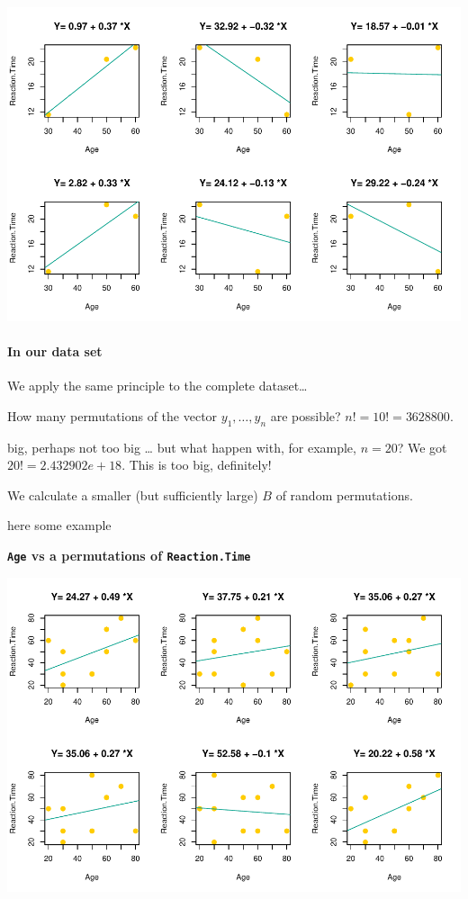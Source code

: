 \documentclass[
]{article}
\begin{document}
\begin{center}\includegraphics{perm_files/figure-latex/unnamed-chunk-9-1} \end{center}

\hypertarget{in-our-data-set}{%
\paragraph{In our data set}\label{in-our-data-set}}

We apply the same principle to the complete dataset\ldots{}

How many permutations of the vector \(y_1,\ldots,y_n\) are possible?
\(n!=10!=3628800\).

big, perhaps not too big \ldots{} but what happen with, for example,
\(n=20\)? We got \(20!=2.432902e+18\). This is too big, definitely!

We calculate a smaller (but sufficiently large) \(B\) of random
permutations.

here some example

\textbf{\texttt{Age} vs a permutations of \texttt{Reaction.Time}}

\begin{center}\includegraphics{perm_files/figure-latex/unnamed-chunk-10-1} \end{center}
\end{document}
